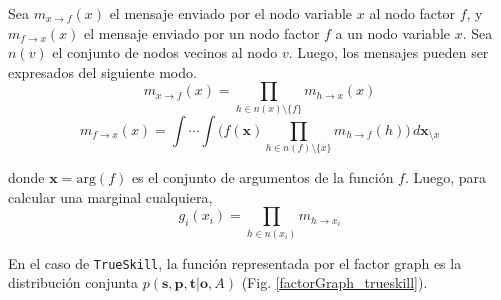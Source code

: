 \documentclass[article]{jss}
\begin{document}
Sea $m_{x \rightarrow f}(x)$ el mensaje enviado por el nodo variable $x$ al nodo factor $f$, y $m_{f \rightarrow x}(x)$ el mensaje enviado por un nodo factor $f$ a un nodo variable $x$.
Sea $n(v)$ el conjunto de nodos vecinos al nodo $v$.
Luego, los mensajes pueden ser expresados del siguiente modo.
\begin{equation}\label{eq:m_v_f} 
m_{x \rightarrow f}(x) = \prod_{h \in n(x) \setminus \{f\} } m_{h \rightarrow x}(x)
\end{equation}
\begin{equation}\label{eq:m_f_v}  
m_{f \rightarrow x}(x) = \int \cdots \int \Big( f(\bm{x}) \prod_{h \in n(f) \setminus \{x\} } m_{h \rightarrow f}(h) \Big) \,  d\bm{x}_{\setminus x}
\end{equation}

donde $\bm{x} = \text{arg}(f)$ es el conjunto de argumentos de la funci\'on $f$. 
Luego, para calcular una marginal cualquiera,
\begin{equation}\label{eq:marginal}
g_i(x_i) = \prod_{h \in n(x_i)} m_{h \rightarrow x_i}
\end{equation}



En el caso de \texttt{TrueSkill},
la funci\'on representada por el factor graph es la distribuci\'on
conjunta $p(\bm{s},\bm{p},\bm{t}|\bm{o},A)$ (Fig.
\ref{factorGraph_trueskill}).
\end{document}
